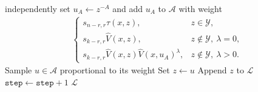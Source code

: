 \documentclass{article}
\numberwithin{theorem}{section}
\numberwithin{proposition}{section}
\numberwithin{corollary}{section}
\numberwithin{lemma}{section}
\numberwithin{conjecture}{section}
\numberwithin{remark}{section}
\numberwithin{definition}{section}
\numberwithin{assumption}{section}
\numberwithin{example}{section}
\newcommand{\calY}{{\mathcal{Y}}}
\begin{document}
\begin{algorithm}[h!]
\begin{algorithmic}[1]
{{        independently set $u_A\gets z^{-A}$ and add $u_A$ to $\mathcal A$ with
        weight
        \begin{align*}
            \begin{cases}
                s_{n-r,r}\tau(x,z), & z\in\calY,\\
                s_{k-r,r}\widehat V(x,z),
                    & z\notin\calY,\ \lambda=0,\\
                s_{k-r,r}\widehat V(x,z)\widehat V(x,u_A)^\lambda,
                    & z\notin\calY,\ \lambda>0.
            \end{cases}
        \end{align*}}}
    \EndIf
    \State Sample $u\in\mathcal A$ proportional to its weight
    \State Set $z\gets u$
    \If{$z\in\calY$}
        \State Append $z$ to $\mathcal L$
    \EndIf
    \State $\texttt{step}\gets\texttt{step}+1$
\EndWhile
\State \Return $\mathcal L$
\end{algorithmic}
\end{algorithm}
\end{document}

